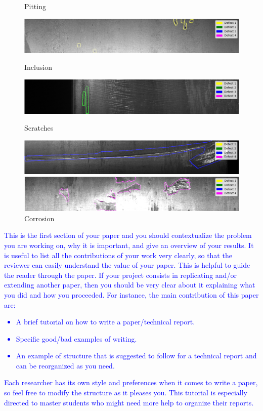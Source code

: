\documentclass[10pt,twocolumn,letterpaper]{article}
\begin{document}
   \begin{figure}[h]
      \centering
      \caption{Pitting} \label{fig:defect1}
      \includegraphics[scale=0.3]{Img_Defect1}
      \caption{Inclusion} \label{fig:defect2}
      \includegraphics[scale=0.3]{Img_Defect2}
      \caption{Scratches} \label{fig:defect3}
      \includegraphics[scale=0.3]{Img_Defect3}
      \caption{Corrosion} \label{fig:defect4}
      \includegraphics[scale=0.3]{Img_Defect4}
   \end{figure}




   \textcolor{blue}{
   This is the first section of your paper and you should contextualize the problem you are working on, why it is important, and give an overview of your results. It is useful to list all the contributions of your work very clearly, so that the reviewer can easily understand the value of your paper. This is helpful to guide the reader through the paper. If your project consists in replicating and/or extending another paper, then you should be very clear about it explaining what you did and how you proceeded.
   For instance, the main contribution of this paper are: 
   \begin{itemize}
      \item A brief tutorial on how to write a paper/technical report.
      \item Specific good/bad examples of writing.
      \item An example of structure that is suggested to follow for a technical report and can be reorganized as you need.
   \end{itemize}
   Each researcher has its own style and preferences when it comes to write a paper, so feel free to modify the structure as it pleases you. 
   This tutorial is especially directed to master students who might need more help to organize their reports.}
\end{document}
